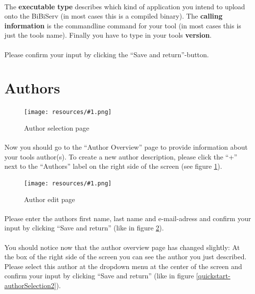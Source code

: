 \documentclass[a4paper,10pt]{book}
\newcommand{\bigpic}[1]{\texttt{[image: resources/\#1.png]}}
\begin{document}
\paragraph{} The \textbf{executable type} describes which kind of application you intend to upload onto the BiBiServ (in most cases this is a compiled binary). The \textbf{calling information} is the commandline command for your tool (in most cases this is just the tools name). Finally you have to type in your tools \textbf{version}.
\paragraph{} Please confirm your input by clicking the ``Save and return''-button.

\section{Authors}

\begin{figure}
 \bigpic{quickstart-authorSelection1}
\caption{Author selection page}
\label{quickstart-authorSelection1}
\end{figure}

\paragraph{} Now you should go to the ``Author Overview'' page to provide information about your tools author(s). To create a new author description, please click the ``+'' next to the ``Authors'' label on the right side of the screen (see figure \ref{quickstart-authorSelection1}).

\begin{figure}
 \bigpic{quickstart-author}
 \caption{Author edit page}
 \label{quickstart-author}
\end{figure}

\paragraph{} Please enter the authors first name, last name and e-mail-adress and confirm your input by clicking ``Save and return'' (like in figure \ref{quickstart-author}).
\paragraph{} You should notice now that the author overview page has changed slightly: At the box of the right side of the screen you can see the author you just described. Please select this author at the dropdown menu at the center of the screen and confirm your input by clicking ``Save and return'' (like in figure \ref{quickstart-authorSelection2}).
\end{document}
